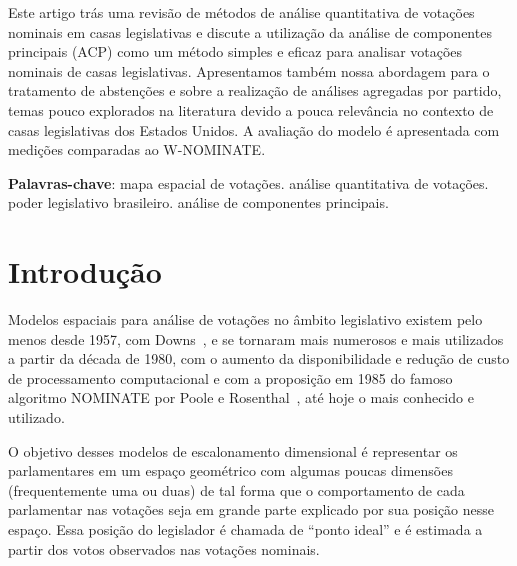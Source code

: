 \documentclass[
	article,			%
	12pt,				%
	oneside,			%
	a4paper,			%
	english,			%
	brazil,				%
	sumario=tradicional,
	oldfontcommands %
	]{abntex2}
\newcommand\wnominate{W-NOMINATE\xspace}
\begin{document}
 

\frenchspacing 

\maketitle 

\begin{resumoumacoluna}
Este artigo trás uma revisão de métodos de análise quantitativa de votações nominais em casas legislativas e discute a utilização da análise de componentes principais (ACP) como um método simples e eficaz para analisar votações nominais de casas legislativas. Apresentamos também nossa abordagem para o tratamento de abstenções e sobre a realização de análises agregadas por partido, temas pouco explorados na literatura devido a pouca relevância no contexto de casas legislativas dos Estados Unidos. A avaliação do modelo é apresentada com medições comparadas ao \wnominate.

\vspace{\onelineskip}

\noindent
\textbf{Palavras-chave}: mapa espacial de votações. análise quantitativa de votações. poder legislativo brasileiro. análise de componentes principais.
\end{resumoumacoluna}

\textual

\section{Introdução}
\label{sec:intro}


Modelos espaciais para análise de votações no âmbito legislativo existem pelo menos desde 1957, com Downs~\cite{downs1957}, e se tornaram mais numerosos e mais utilizados a partir da década de 1980, com o aumento da disponibilidade e redução de custo de processamento computacional e com a proposição em 1985 do famoso algoritmo NOMINATE por Poole e Rosenthal~\cite{poole1985nominate}, até hoje o mais conhecido e utilizado. 

O objetivo desses modelos de escalonamento dimensional é representar os parlamentares em um espaço geométrico com algumas poucas dimensões (frequentemente uma ou duas) de tal forma que o comportamento de cada parlamentar nas votações seja em grande parte explicado por sua posição nesse espaço. Essa posição do legislador é chamada de ``ponto ideal'' e é estimada a partir dos votos observados nas votações nominais.
\end{document}
